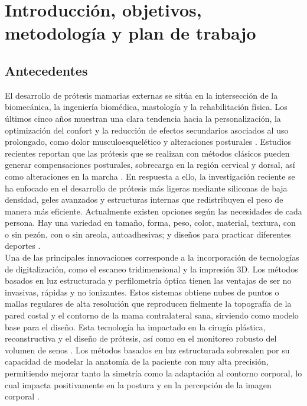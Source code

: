 \documentclass[12pt,a4paper]{article}
\begin{document}
\section{Introducción, objetivos, metodología y plan de trabajo}

\subsection{Antecedentes}
El desarrollo de prótesis mamarias externas se sitúa en la intersección de la biomecánica, 
la ingeniería biomédica, mastología y la rehabilitación física. Los últimos cinco años muestran 
una clara tendencia hacia la personalización, la optimización del confort y la reducción de efectos
secundarios asociados al uso prolongado, como dolor musculoesquelético y alteraciones 
posturales \cite{ACS2023,WHO2021,surmeli2025postural,Hojan2016}. Estudios recientes reportan que las prótesis que se realizan con métodos clásicos pueden generar compensaciones posturales, sobrecarga en la región cervical 
y dorsal, así como alteraciones en la marcha \cite{Koralewska2022}. En respuesta a ello, 
la investigación reciente se ha enfocado en el desarrollo de prótesis más ligeras mediante 
siliconas de baja densidad, geles avanzados y estructuras internas que redistribuyen el peso 
de manera más eficiente. Actualmente existen opciones según las necesidades de cada persona. Hay una variedad en tamaño, forma, peso, color, material, textura, con o sin pezón, con o sin areola, autoadhesivas; y diseños para practicar diferentes deportes \cite{crompvoets2012prosthetic,fitch2012perspectives,livingston2005women}. \\

Una de las principales innovaciones corresponde a la incorporación de tecnologías de digitalización, 
como el escaneo tridimensional y la impresión 3D. Los métodos basados en luz estructurada y perfilometría óptica tienen las ventajas de ser no invasivas, rápidas y no ionizantes. Estos sistemas obtiene nubes de puntos o mallas regulares de alta resolución que reproducen fielmente la topografía de la pared costal y el contorno de la mama contralateral sana, sirviendo como modelo base para el diseño. Esta tecnología ha impactado en la cirugía plástica, reconstructiva y el diseño de prótesis, así como en el monitoreo robusto del volumen de senos \cite{de2024comprehensive,dijkman2024comparative}. Los métodos basados en luz estructurada sobresalen por su capacidad de modelar la anatomía de la paciente con muy alta precisión, permitiendo mejorar tanto la simetría como la adaptación al contorno corporal, lo cual impacta positivamente en la postura y en la percepción de la imagen corporal \cite{eggbeer2011computer,paxton2022capturing}.  
\end{document}
